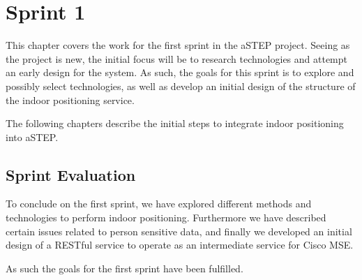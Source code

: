 \chapter{Sprint 1}
This chapter covers the work for the first sprint in the aSTEP project. Seeing as the project is new, the initial focus will be to research technologies and attempt an early design for the system. As such, the goals for this sprint is to explore and possibly select technologies, as well as develop an initial design of the structure of the indoor positioning service. 

The following chapters describe the initial steps to integrate indoor positioning into aSTEP.





\section{Sprint Evaluation}
To conclude on the first sprint, we have explored different methods and technologies to perform indoor positioning. Furthermore we have described certain issues related to person sensitive data, and finally we developed an initial design of a RESTful service to operate as an intermediate service for Cisco MSE. 

As such the goals for the first sprint have been fulfilled.